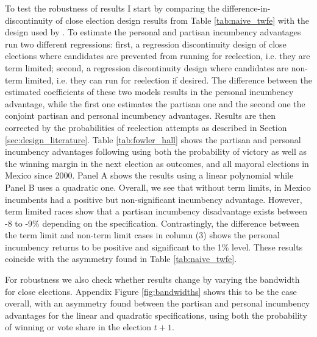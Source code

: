 \documentclass[12pt]{amsart}
\makeatletter
\def\subsection{\@startsection{subsection}{2}
	\z@{.8\linespacing\@plus.7\linespacing}{.7\linespacing}{\large}}
\numberwithin{equation}{section}
\theoremstyle{definition}
\theoremstyle{definition}
\theoremstyle{definition}
\makeatother
\begin{document}
    
\subsection{Robustness tests \label{sec:robustness}} 
  
To test the robustness of results I start by comparing the difference-in-discontinuity of close election design results from Table \ref{tab:naive_twfe} with the design used by \citet{fowler_hall_2014}. To estimate the personal and partisan incumbency advantages \citet{fowler_hall_2014} run two different regressions: first, a regression discontinuity design of close elections where candidates are prevented from running for reelection, i.e. they are term limited; second, a regression discontinuity design where candidates are non-term limited, i.e. they can run for reelection if desired. The difference between the estimated coefficients of these two models results in the personal incumbency advantage, while the first one estimates the partisan one and the second one the conjoint partisan and personal incumbency advantages. Results are then corrected by the probabilities of reelection attempts as described in Section \ref{sec:design_literature}. Table \ref{tab:fowler_hall} shows the partisan and personal incumbency advantages following \citet{fowler_hall_2014} using both the probability of victory as well as the winning margin in the next election as outcomes, and all mayoral elections in Mexico since 2000. Panel A shows the results using a linear polynomial while Panel B uses a quadratic one. Overall, we see that without term limits, in Mexico incumbents had a positive but non-significant incumbency advantage. However, term limited races show that a partisan incumbency disadvantage exists between -8 to -9\% depending on the specification. Contrastingly, the difference between the term limit and non-term limit cases in column (3) shows the personal incumbency returns to be positive and significant to the 1\% level. These results coincide with the asymmetry found in Table \ref{tab:naive_twfe}.  

   


For robustness we also check whether results change by varying the bandwidth for close elections. Appendix Figure \ref{fig:bandwidths} shows this to be the case overall, with an asymmetry found between the partisan and personal incumbency advantages for the linear and quadratic specifications, using both the probability of winning or vote share in the election $t+1$.       
\end{document}
